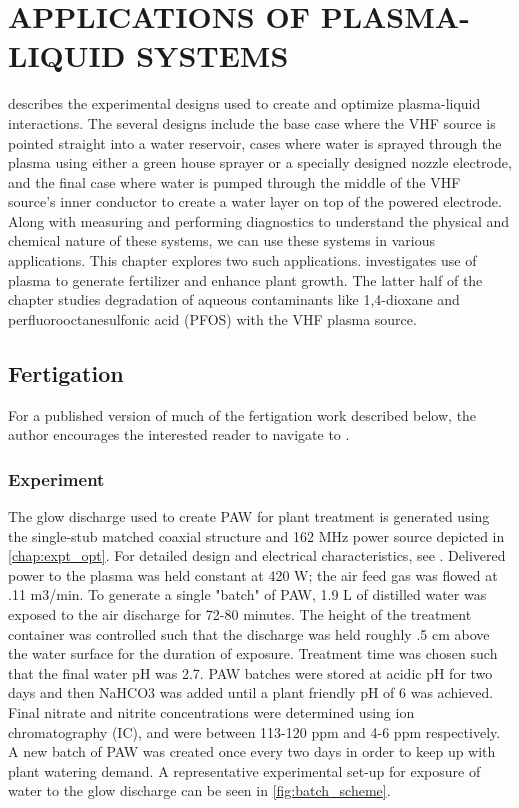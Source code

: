 \chapter{APPLICATIONS OF PLASMA-LIQUID SYSTEMS}
\label{chap:applications}

 describes the experimental designs used to create and optimize plasma-liquid interactions. The several designs include the base case where the VHF source is pointed straight into a water reservoir, cases where water is sprayed through the plasma using either a green house sprayer or a specially designed nozzle electrode, and the final case where water is pumped through the middle of the VHF source's inner conductor to create a water layer on top of the powered electrode. Along with measuring and performing diagnostics to understand the physical and chemical nature of these systems, we can use these systems in various applications. This chapter explores two such applications.  investigates use of plasma to generate fertilizer and enhance plant growth. The latter half of the chapter studies degradation of aqueous contaminants like 1,4-dioxane and perfluorooctanesulfonic acid (PFOS) with the VHF plasma source.

\section{Fertigation}
\label{sec:fertigation}

For a published version of much of the fertigation work described below, the author encourages the interested reader to navigate to \cite{Lindsay2014}.

\subsection{Experiment}

The glow discharge used to create PAW for plant treatment is generated using the single-stub matched coaxial structure and 162 MHz power source depicted in \cref{chap:expt_opt}.  For detailed design and electrical characteristics, see \cite{byrns2012vhf}.   Delivered power to the plasma was held constant at 420 W; the air feed gas was flowed at .11 m3/min.  To generate a single "batch" of PAW, 1.9 L of distilled water was exposed to the air discharge for 72-80 minutes.  The height of the treatment container was controlled such that the discharge was held roughly .5 cm above the water surface for the duration of exposure.  Treatment time was chosen such that the final water pH was 2.7.  PAW batches were stored at acidic pH for two days and then NaHCO3 was added until a plant friendly pH of 6 was achieved. Final nitrate and nitrite concentrations were determined using ion chromatography (IC), and were between 113-120 ppm and 4-6 ppm respectively. A new batch of PAW was created once every two days in order to keep up with plant watering demand.  A representative experimental set-up for exposure of water to the glow discharge can be seen in \cref{fig:batch_scheme}.

